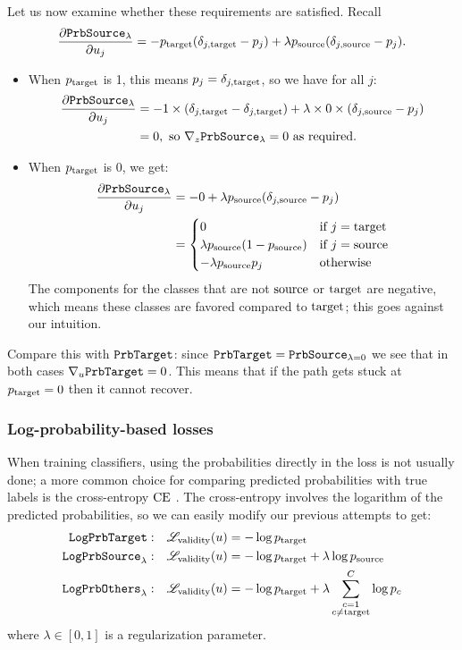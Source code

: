 \documentclass[../main.tex]{subfiles}
\begin{document}
Let us now examine whether these requirements are satisfied. Recall
\begin{align*}
    \frac{\partial \mathtt{PrbSource}_{\lambda}}{\partial u_j}
    = - p_{\mathrm{target}} (\delta_{j, \mathrm{target}} - p_j) + \lambda p_{\mathrm{source}} (\delta_{j, \mathrm{source}} - p_j).
\end{align*}
\begin{itemize}
    \item When $p_{\mathrm{target}}$ is 1, this means $p_j = \delta_{j, \mathrm{target}}$, so we have for all $j$:
         \begin{align*}
              \frac{\partial \mathtt{PrbSource}_{\lambda}}{\partial u_j}
              &= -1 \times (\delta_{j, \mathrm{target}} -\delta_{j, \mathrm{target}}) + \lambda \times 0 \times (\delta_{j, \mathrm{source}} - p_j) \\
              &= 0,\text{ so }  \nabla_{z} \mathtt{PrbSource}_{\lambda} = 0 \text{ as required.}
         \end{align*}
    \item When $p_{\mathrm{target}}$ is 0, we get:
         \begin{align*}
              \frac{\partial \mathtt{PrbSource}_{\lambda}}{\partial u_j}
               & = -0 + \lambda p_{\mathrm{source}} (\delta_{j, \mathrm{source}} - p_j)                        \\
               & = \begin{cases}
                    0                                 & \text{if } j = \mathrm{target} \\
                    \lambda p_{\mathrm{source}} (1 - p_{\mathrm{source}}) & \text{if } j = \mathrm{source} \\
                    - \lambda p_{\mathrm{source}} p_j           & \text{otherwise}
               \end{cases}
         \end{align*}
         The components for the classes that are not $\mathrm{source}$ or $\mathrm{target}$ are negative, which means these classes are favored compared to $\mathrm{target}$;
         this goes against our intuition.
\end{itemize}

Compare this with $\mathtt{PrbTarget}$: since $\mathtt{PrbTarget} = \mathtt{PrbSource}_{\lambda=0}$ we see that in both cases $\nabla_{u} \mathtt{PrbTarget} = 0$.
This means that if the path gets stuck at $p_{\mathrm{target}} = 0$ then it cannot recover.

\subsubsection{Log-probability-based losses}

When training classifiers, using the probabilities directly in the loss is not usually done; a more common choice
for comparing predicted probabilities with true labels is the cross-entropy $\text{CE}$ \cite{murphyMachine2012}.
The cross-entropy involves the logarithm of the predicted probabilities, so we can easily modify our previous attempts to get:
\begin{align*}
    \mathtt{LogPrbTarget}{}:        & \quad    \mathscr{L}_\text{validity}(u) = - \log p_{\mathrm{target}}                              \\
    \mathtt{LogPrbSource}_{\lambda}: & \quad    \mathscr{L}_\text{validity}(u) = - \log p_{\mathrm{target}} + \lambda \log p_{\mathrm{source}}    \\
    \mathtt{LogPrbOthers}_{\lambda}: & \quad    \mathscr{L}_\text{validity}(u) = - \log p_{\mathrm{target}} + \lambda \sum_{\substack{{c}=1 \\ {c} \neq \mathrm{target}}}^C \log p_c
\end{align*}
where $\lambda \in [0, 1]$ is a regularization parameter.
\end{document}

